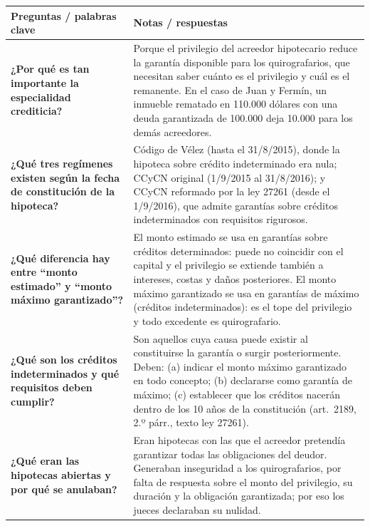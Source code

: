 \documentclass[12pt,oneside]{book}
\begin{document}
\begin{longtable}{
    >{\raggedright\arraybackslash}p{}
    >{\raggedright\arraybackslash}p{}
}
\toprule
\textbf{Preguntas / palabras clave} & \textbf{Notas / respuestas} \\
\midrule
\endhead
\bottomrule
\endfoot

\textbf{¿Por qué es tan importante la especialidad crediticia?} &
Porque el privilegio del acreedor hipotecario reduce la garantía disponible para los quirografarios, que necesitan saber cuánto es el privilegio y cuál es el remanente. En el caso de Juan y Fermín, un inmueble rematado en 110.000 dólares con una deuda garantizada de 100.000 deja 10.000 para los demás acreedores. \\[0.6em]

\textbf{¿Qué tres regímenes existen según la fecha de constitución de la hipoteca?} &
Código de Vélez (hasta el 31/8/2015), donde la hipoteca sobre crédito indeterminado era nula; CCyCN original (1/9/2015 al 31/8/2016); y CCyCN reformado por la ley 27261 (desde el 1/9/2016), que admite garantías sobre créditos indeterminados con requisitos rigurosos. \\[0.6em]

\textbf{¿Qué diferencia hay entre ``monto estimado'' y ``monto máximo garantizado''?} &
El monto estimado se usa en garantías sobre créditos determinados: puede no coincidir con el capital y el privilegio se extiende también a intereses, costas y daños posteriores. El monto máximo garantizado se usa en garantías de máximo (créditos indeterminados): es el tope del privilegio y todo excedente es quirografario. \\[0.6em]

\textbf{¿Qué son los créditos indeterminados y qué requisitos deben cumplir?} &
Son aquellos cuya causa puede existir al constituirse la garantía o surgir posteriormente. Deben: (a) indicar el monto máximo garantizado en todo concepto; (b) declararse como garantía de máximo; (c) establecer que los créditos nacerán dentro de los 10 años de la constitución (art.~2189, 2.º párr., texto ley 27261). \\[0.6em]

\textbf{¿Qué eran las hipotecas abiertas y por qué se anulaban?} &
Eran hipotecas con las que el acreedor pretendía garantizar todas las obligaciones del deudor. Generaban inseguridad a los quirografarios, por falta de respuesta sobre el monto del privilegio, su duración y la obligación garantizada; por eso los jueces declaraban su nulidad. \\[0.6em]


\end{longtable}
\end{document}
